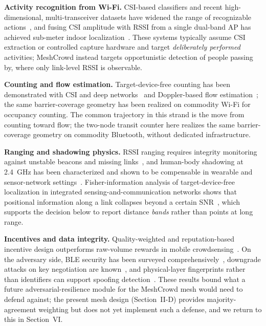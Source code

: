 \documentclass[journal,10pt]{IEEEtran}
\begin{document}
\textbf{Activity recognition from Wi-Fi.} CSI-based classifiers and recent
high-dimensional, multi-transceiver datasets have widened the range of
recognizable actions~\cite{ma2019wifi,wong2024}, and fusing CSI amplitude with RSSI from
a single dual-band AP has achieved sub-meter indoor
localization~\cite{sanchez2020}. These systems typically assume CSI
extraction or controlled capture hardware and target \emph{deliberately
performed} activities; MeshCrowd instead targets opportunistic detection
of people passing by, where only link-level RSSI is observable.

\textbf{Counting and flow estimation.} Target-device-free counting has been
demonstrated with CSI and deep networks~\cite{khan2023} and Doppler-based flow
estimation~\cite{zhou2020}; the same barrier-coverage geometry has been
realized on commodity Wi-Fi for occupancy counting. The common trajectory in this strand is the
move from counting toward flow; the two-node transit counter here realizes
the same barrier-coverage geometry on commodity Bluetooth, without dedicated
infrastructure.

\textbf{Ranging and shadowing physics.} RSSI ranging requires integrity
monitoring against unstable beacons and missing
links~\cite{ramirez2021,bai2020}, and human-body shadowing at 2.4~GHz has
been characterized and shown to be compensable in wearable and
sensor-network settings~\cite{januszkiewicz2018}. Fisher-information analysis
of target-device-free localization in integrated sensing-and-communication networks
shows that positional information along a link collapses beyond a certain
SNR~\cite{li2024}, which supports the decision below to report distance
\emph{bands} rather than points at long range.

\textbf{Incentives and data integrity.} Quality-weighted and
reputation-based incentive design outperforms raw-volume rewards in mobile
crowdsensing~\cite{zhang2022,wang2018}. On the adversary side, BLE security
has been surveyed comprehensively~\cite{casar2022}, downgrade attacks on key
negotiation are known~\cite{antonioli2020}, and physical-layer fingerprints
rather than identifiers can support spoofing
detection~\cite{cai2024,ryan2013woot}. These results bound what
a future adversarial-resilience module for the MeshCrowd mesh would need
to defend against; the present mesh design (Section~II-D) provides
majority-agreement weighting but does not yet implement such a defense, and
we return to this in Section~VI.
\end{document}
